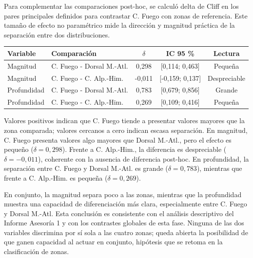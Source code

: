 \documentclass[
  spanish,
  letterpaper,
  DIV=11,
  numbers=noendperiod]{scrartcl}
\begin{document}
\noindent
\begin{minipage}[t]{0.45\textwidth}
\vspace{0pt}
Para complementar las comparaciones post-hoc, se calculó delta de Cliff en los pares principales definidos para contrastar C. Fuego con zonas de referencia. Este tamaño de efecto no paramétrico mide la dirección y magnitud práctica de la separación entre dos distribuciones.
\end{minipage}\hfill
\begin{minipage}[t]{0.51\textwidth}
\vspace{0pt}
\begingroup
\scriptsize
\centering
\setlength{\tabcolsep}{0.8pt}
\renewcommand{\arraystretch}{0.82}
{}
\label{tbl-cliff-mag-depth}
\hypertarget{dest-tbl-cliff-mag-depth}{}
\begin{tabular*}{\linewidth}{@{\extracolsep{\fill}}llccc@{}}
\toprule
Variable & Comparación & $\delta$ & IC 95 \% & Lectura \\
\midrule
Magnitud & C. Fuego - Dorsal M.-Atl. & 0,298 & [0,114; 0,463] & Pequeña \\
Magnitud & C. Fuego - C. Alp.-Him. & -0,011 & [-0,159; 0,137] & Despreciable \\
Profundidad & C. Fuego - Dorsal M.-Atl. & 0,783 & [0,679; 0,856] & Grande \\
Profundidad & C. Fuego - C. Alp.-Him. & 0,269 & [0,109; 0,416] & Pequeña \\
\bottomrule
\end{tabular*}
\par\vspace{0.10em}
\endgroup
\end{minipage}
\par\vspace{-0.25em}

Valores positivos indican que C. Fuego tiende a presentar valores
mayores que la zona comparada; valores cercanos a cero indican escasa
separación. En magnitud, C. Fuego presenta valores algo mayores que
Dorsal M.-Atl., pero el efecto es pequeño (\(\delta=0{,}298\)). Frente a
C. Alp.-Him., la diferencia es despreciable (\(\delta=-0{,}011\)),
coherente con la ausencia de diferencia post-hoc. En profundidad, la
separación entre C. Fuego y Dorsal M.-Atl. es grande
(\(\delta=0{,}783\)), mientras que frente a C. Alp.-Him. es pequeña
(\(\delta=0{,}269\)).

En conjunto, la magnitud separa poco a las zonas, mientras que la
profundidad muestra una capacidad de diferenciación más clara,
especialmente entre C. Fuego y Dorsal M.-Atl. Esta conclusión es
consistente con el análisis descriptivo del Informe Asesoría 1 y con los
contrastes globales de esta fase. Ninguna de las dos variables
discrimina por sí sola a las cuatro zonas; queda abierta la posibilidad
de que ganen capacidad al actuar en conjunto, hipótesis que se retoma en
la clasificación de zonas.
\end{document}
